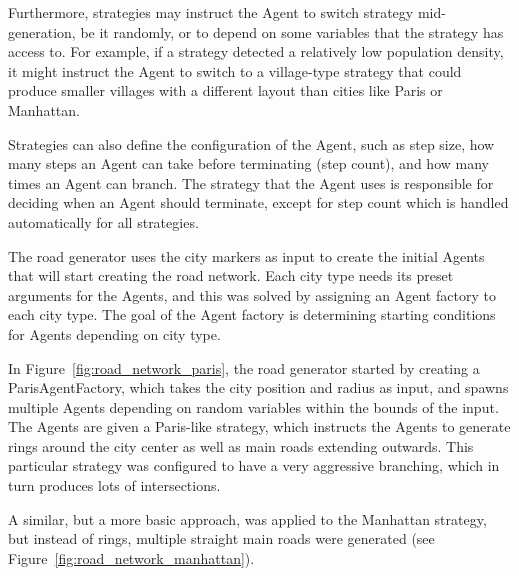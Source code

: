 Furthermore, strategies may instruct the Agent to switch strategy mid-generation, be it randomly, or to depend on some variables that the strategy has access to.
For example, if a strategy detected a relatively low population density, it might instruct the Agent to switch to a village-type strategy that could produce smaller villages with a different layout than cities like Paris or Manhattan.

Strategies can also define the configuration of the Agent, such as step size, how many steps an Agent can take before terminating (step count), and how many times an Agent can branch.
The strategy that the Agent uses is responsible for deciding when an Agent should terminate, except for step count which is handled automatically for all strategies.

The road generator uses the city markers as input to create the initial Agents that will start creating the road network.
Each city type needs its preset arguments for the Agents, and this was solved by assigning an Agent factory to each city type.
The goal of the Agent factory is determining starting conditions for Agents depending on city type.

In Figure~\ref{fig:road_network_paris}, the road generator started by creating a ParisAgentFactory, which takes the city position and radius as input, and spawns multiple Agents depending on random variables within the bounds of the input.
The Agents are given a Paris-like strategy, which instructs the Agents to generate rings around the city center as well as main roads extending outwards.
This particular strategy was configured to have a very aggressive branching, which in turn produces lots of intersections.

A similar, but a more basic approach, was applied to the Manhattan strategy, but instead of rings, multiple straight main roads were generated (see Figure~\ref{fig:road_network_manhattan}).

